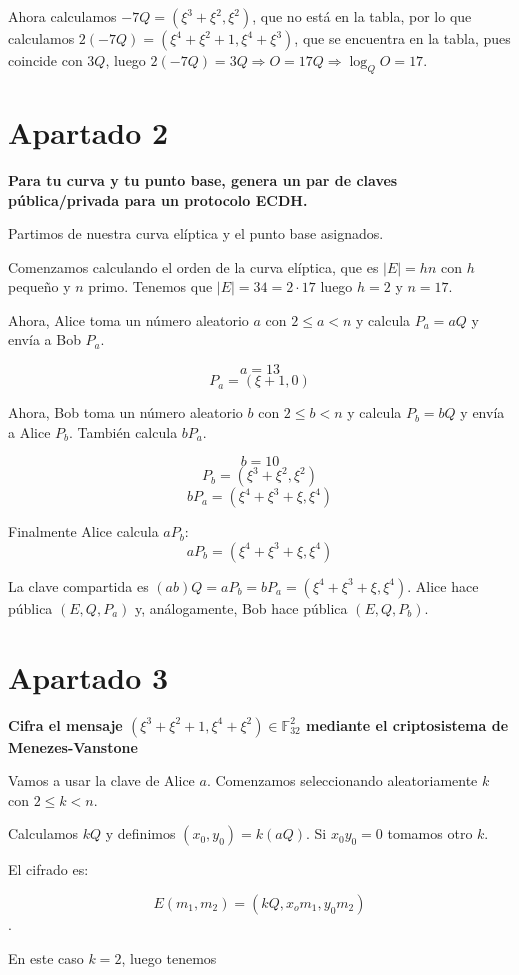 \documentclass[a4paper]{article}
\begin{document}
Ahora calculamos $-7Q=(\xi^3+\xi^2, \xi^2)$, que no está en la tabla, por lo que calculamos $2(-7Q)=(\xi^4+\xi^2+1, \xi^4+\xi^3)$, que se encuentra en la tabla, pues coincide con $3Q$, luego $2(-7Q)=3Q \Rightarrow O = 17Q \Rightarrow \log_Q O = 17$.




\section{Apartado 2}

\textbf{Para  tu  curva  y  tu  punto  base,  genera  un  par  de  claves  pública/privada para un protocolo ECDH.}

Partimos de nuestra curva elíptica y el punto base asignados.

Comenzamos calculando el orden de la curva elíptica, que es $|E|=hn$ con $h$ pequeño y $n$ primo. Tenemos que $|E|=34=2\cdot 17$ luego $h=2$ y $n=17$.

Ahora, Alice toma un número aleatorio $a$ con $2\leq a < n$ y calcula $P_a=aQ$ y envía a Bob $P_a$.

$$a= 13$$
$$P_a=(\xi+1, 0)$$

Ahora, Bob toma un número aleatorio $b$ con $2\leq b < n$ y calcula $P_b=bQ$ y envía a Alice $P_b$.
También calcula $bP_a$.

$$b= 10$$
$$P_b=(\xi^3+\xi^2, \xi^2)$$
$$bP_a=(\xi^4+\xi^3+\xi, \xi^4)$$

Finalmente Alice calcula $aP_b$:
$$aP_b=(\xi^4+\xi^3+\xi, \xi^4)$$

La clave compartida es $(ab)Q=aP_b=bP_a=(\xi^4+\xi^3+\xi, \xi^4)$.
Alice hace pública $(E,Q,P_a)$ y, análogamente, Bob hace pública $(E,Q,P_b)$.

\section{Apartado 3}

\textbf{Cifra el mensaje $(\xi^3+\xi^2+1,\xi^4+\xi^2)\in \mathbb{F}^2_{32}$ mediante el criptosistema de Menezes-Vanstone}

Vamos a usar la clave de Alice $a$. Comenzamos seleccionando aleatoriamente $k$ con $2\leq k < n$.

Calculamos $kQ$ y definimos $(x_0,y_0)= k(aQ)$. Si $x_0y_0=0$ tomamos otro $k$.

El cifrado es:

$$E(m_1,m_2)=(kQ, x_om_1, y_0m_2)$$.

En este caso $k=2$, luego tenemos
\end{document}
